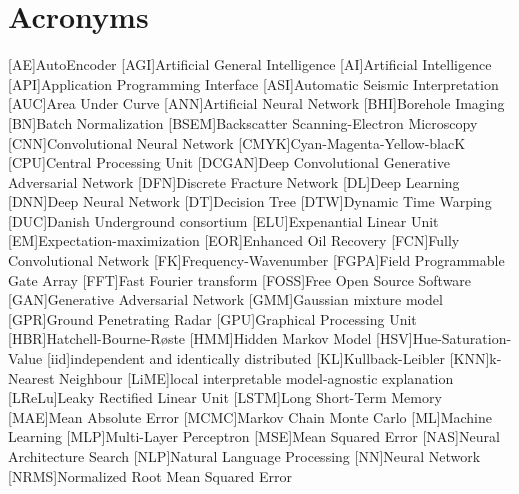 \chapter{Acronyms}

\begin{acronym}[DCGANS]
[AE]{AutoEncoder}
[AGI]{Artificial General Intelligence}
[AI]{Artificial Intelligence}
[API]{Application Programming Interface}
[ASI]{Automatic Seismic Interpretation}
[AUC]{Area Under Curve}
[ANN]{Artificial Neural Network}
[BHI]{Borehole Imaging}
[BN]{Batch Normalization}
[BSEM]{Backscatter Scanning-Electron Microscopy}
[CNN]{Convolutional Neural Network}
[CMYK]{Cyan-Magenta-Yellow-blacK}
[CPU]{Central Processing Unit}
[DCGAN]{Deep Convolutional Generative Adversarial Network}
[DFN]{Discrete Fracture Network}
[DL]{Deep Learning}
[DNN]{Deep Neural Network}
[DT]{Decision Tree}
[DTW]{Dynamic Time Warping}
[DUC]{Danish Underground consortium}
[ELU]{Expenantial Linear Unit}
[EM]{Expectation-maximization}
[EOR]{Enhanced Oil Recovery}
[FCN]{Fully Convolutional Network}
[FK]{Frequency-Wavenumber}
[FGPA]{Field Programmable Gate Array}
[FFT]{Fast Fourier transform}
[FOSS]{Free Open Source Software}
[GAN]{Generative Adversarial Network}
[GMM]{Gaussian mixture model}
[GPR]{Ground Penetrating Radar}
[GPU]{Graphical Processing Unit}
[HBR]{Hatchell-Bourne-R{\o}ste}
[HMM]{Hidden Markov Model} 
[HSV]{Hue-Saturation-Value}
[iid]{independent and identically distributed}
[KL]{Kullback-Leibler}
[KNN]{k-Nearest Neighbour}
[LiME]{local interpretable model-agnostic explanation}
[LReLu]{Leaky Rectified Linear Unit}
[LSTM]{Long Short-Term Memory}
[MAE]{Mean Absolute Error}
[MCMC]{Markov Chain Monte Carlo}
[ML]{Machine Learning}
[MLP]{Multi-Layer Perceptron}
[MSE]{Mean Squared Error}
[NAS]{Neural Architecture Search}
[NLP]{Natural Language Processing}
[NN]{Neural Network}
[NRMS]{Normalized Root Mean Squared Error}

\end{acronym}
